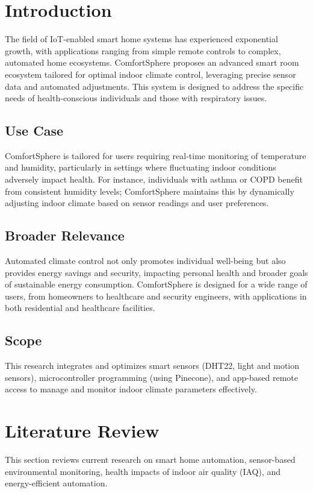 \documentclass[a4paper]{scrartcl}
\title{\paperTitle}
\author{
    Juhi Joshi~<jr.joshi@stud.fh-sm.de>, 316800\\
    Amardeep Mishra~<a.mishra@stud.fh-sm.de>, 316652\\
    Hardikkumar Savaliya~<hv.savaliya@stud.fh-sm.de>, 313904\\
    Mohammad Sheikh~<mzi.sheikh@stud.fh-sm.de>, 312538\\
    Hammad Chaudhary<rehman@stud.fh-sm.de>, 313955\\
    Riya varghese~<rm.varghese.a@stud.fh-sm.de>, 316773
    }
\date{}
\begin{document}
	\maketitle

\section{Introduction}
The field of IoT-enabled smart home systems has experienced exponential growth, with applications ranging from simple remote controls to complex, automated home ecosystems. ComfortSphere proposes an advanced smart room ecosystem tailored for optimal indoor climate control, leveraging precise sensor data and automated adjustments. This system is designed to address the specific needs of health-conscious individuals and those with respiratory issues.

\subsection{Use Case}
ComfortSphere is tailored for users requiring real-time monitoring of temperature and humidity, particularly in settings where fluctuating indoor conditions adversely impact health. For instance, individuals with asthma or COPD benefit from consistent humidity levels; ComfortSphere maintains this by dynamically adjusting indoor climate based on sensor readings and user preferences.

\subsection{Broader Relevance}
Automated climate control not only promotes individual well-being but also provides energy savings and security, impacting personal health and broader goals of sustainable energy consumption. ComfortSphere is designed for a wide range of users, from homeowners to healthcare and security engineers, with applications in both residential and healthcare facilities.

\subsection{Scope}
This research integrates and optimizes smart sensors (DHT22, light and motion sensors), microcontroller programming (using Pinecone), and app-based remote access to manage and monitor indoor climate parameters effectively.

\section{Literature Review}
This section reviews current research on smart home automation, sensor-based environmental monitoring, health impacts of indoor air quality (IAQ), and energy-efficient automation.
\end{document}
